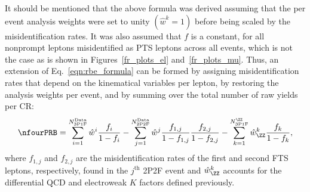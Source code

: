 It should be mentioned that the above formula was derived assuming that the per event analysis weights were set to unity $\left( \hat{w}^k = 1 \right)$ before being scaled by the misidentification rates.
It was also assumed that $f$ is a constant, for all nonprompt leptons misidentified as PTS leptons across all events, which is not the case as is shown in Figures~\ref{fr_plots_el} and~\ref{fr_plots_mu}.
Thus, an extension of Eq.~\ref{eqn:rbe_formula} can be formed by assigning misidentification rates that depend on the kinematical variables per lepton,
by restoring the analysis weights per event,
and by summing over the total number of raw yields per CR:
\begin{equation}
	\label{eqn:rbe_formula_final}
	\nfourPRB =
	  \sum_{i=1}^{N_{\text{3P1F}}^\text{Data}} \hat{w}^i \frac{f_i}{1 - f_i}
	- \sum_{j=1}^{N_{\text{2P2F}}^\text{Data}} \hat{w}^j \frac{f_{1,j}}{1 - f_{1,j}}\frac{f_{2,j}}{1 - f_{2,j}}
	- \sum_{k=1}^{N_{\text{3P1F}}^{\ZZ}} \hat{w}^{k}_{\ZZ} \frac{f_k}{1 - f_k},
\end{equation}
where $f_{1,j}$ and $f_{2,j}$ are the misidentification rates of the first and second FTS leptons, respectively, found in the $j^{\text{th}}$ 2P2F event
and $\hat{w}^k_{\ZZ}$ accounts for the differential QCD and electroweak $K$ factors defined previously. %
